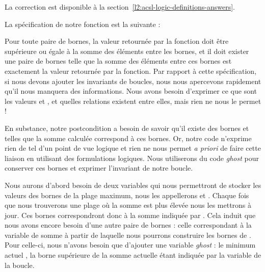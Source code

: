 


La correction est disponible à la section~\ref{l2:acsl-logic-definitions-answers}.


La spécification de notre fonction est la suivante :






Pour toute paire de bornes, la valeur retournée par la fonction doit être
supérieure ou égale à la somme des éléments entre les bornes, et il doit exister
une paire de bornes telle que la somme des éléments entre ces bornes est
exactement la valeur retournée par la fonction. Par rapport à cette spécification,
si nous devons ajouter les invariants de boucles, nous nous apercevons rapidement
qu'il nous manquera des informations. Nous avons besoin d'exprimer ce que sont
les valeurs  et , et quelles relations existent
entre elles, mais rien ne nous le permet !



En substance, notre postcondition a besoin de savoir qu'il existe des
bornes  et  telles que la somme calculée correspond à ces bornes.
Or, notre code n'exprime rien de tel d'un point de vue logique et rien ne nous
permet \textit{a priori} de faire cette liaison en utilisant des formulations logiques.
Nous utiliserons du code \textit{ghost} pour conserver ces bornes et exprimer
l'invariant de notre boucle.



Nous aurons d'abord besoin de deux variables qui nous permettront de stocker
les valeurs des bornes de la plage maximum, nous les appellerons 
et . Chaque fois que nous trouverons une plage où la somme est plus
élevée nous les mettrons à jour. Ces bornes correspondront donc à la somme indiquée
par . Cela induit que nous avons encore besoin d'une autre paire de
bornes : celle correspondant à la variable de somme  à partir de laquelle
nous pourrons construire les bornes de . Pour celle-ci, nous n'avons
besoin que d'ajouter une variable \textit{ghost} : le minimum actuel , la
borne supérieure de la somme actuelle étant indiquée par la variable  de la
boucle.






